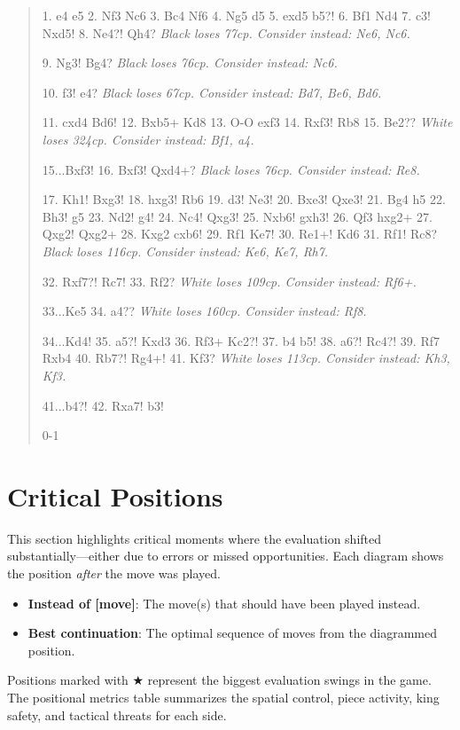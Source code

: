\documentclass[11pt]{book}
\begin{document}
\begin{quote}
1. e4 e5
2. Nf3 Nc6
3. Bc4 Nf6
4. Ng5 d5
5. exd5 b5?!
6. Bf1 Nd4
7. c3! Nxd5!
8. Ne4?! Qh4?
\textit{Black loses 77cp. Consider instead: Ne6, Nc6.}

9. Ng3! Bg4?
\textit{Black loses 76cp. Consider instead: Nc6.}

10. f3! e4?
\textit{Black loses 67cp. Consider instead: Bd7, Be6, Bd6.}

11. cxd4 Bd6!
12. Bxb5+ Kd8
13. O-O exf3
14. Rxf3! Rb8
15. Be2??
\textit{White loses 324cp. Consider instead: Bf1, a4.}

15...Bxf3!
16. Bxf3! Qxd4+?
\textit{Black loses 76cp. Consider instead: Re8.}

17. Kh1! Bxg3!
18. hxg3! Rb6
19. d3! Ne3!
20. Bxe3! Qxe3!
21. Bg4 h5
22. Bh3! g5
23. Nd2! g4!
24. Nc4! Qxg3!
25. Nxb6! gxh3!
26. Qf3 hxg2+
27. Qxg2! Qxg2+
28. Kxg2 cxb6!
29. Rf1 Ke7!
30. Re1+! Kd6
31. Rf1! Rc8?
\textit{Black loses 116cp. Consider instead: Ke6, Ke7, Rh7.}

32. Rxf7?! Rc7!
33. Rf2?
\textit{White loses 109cp. Consider instead: Rf6+.}

33...Ke5
34. a4??
\textit{White loses 160cp. Consider instead: Rf8.}

34...Kd4!
35. a5?! Kxd3
36. Rf3+ Kc2?!
37. b4 b5!
38. a6?! Rc4?!
39. Rf7 Rxb4
40. Rb7?! Rg4+!
41. Kf3?
\textit{White loses 113cp. Consider instead: Kh3, Kf3.}

41...b4?!
42. Rxa7! b3!

0-1
\end{quote}

\section{Critical Positions}

This section highlights critical moments where the evaluation shifted substantially---either due to errors or missed opportunities. Each diagram shows the position \emph{after} the move was played.

\begin{itemize}
\item \textbf{Instead of [move]}: The move(s) that should have been played instead.
\item \textbf{Best continuation}: The optimal sequence of moves from the diagrammed position.
\end{itemize}

Positions marked with {\color{blue}$\bigstar$} represent the biggest evaluation swings in the game. The positional metrics table summarizes the spatial control, piece activity, king safety, and tactical threats for each side.
\end{document}
